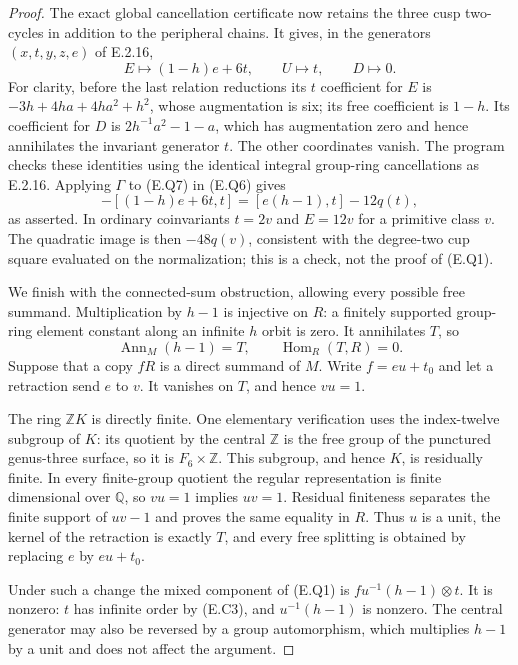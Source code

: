 \begin{proof}
The exact global cancellation certificate now retains
the three cusp two-cycles in addition to the peripheral
chains.  It gives, in the generators $(x,t,y,z,e)$ of
E.2.16,
\[
 E\longmapsto(1-h)e+6t,\qquad
 U\longmapsto t,\qquad D\longmapsto0.
 \tag{E.Q7}
\]
For clarity, before the last relation reductions its
$t$ coefficient for $E$ is
$-3h+4ha+4ha^2+h^2$, whose augmentation is six;
its free coefficient is $1-h$.  Its coefficient for $D$
is $2h^{-1}a^2-1-a$, which has augmentation zero and hence
annihilates the invariant generator $t$.  The other
coordinates vanish.  The program
 checks these identities
using the identical integral group-ring cancellations as
E.2.16.  Applying $\Gamma$ to (E.Q7) in (E.Q6) gives
\[
 -[(1-h)e+6t,t]
                =[e(h-1),t]-12q(t),
\]
as asserted.  In ordinary coinvariants $t=2v$ and
$E=12v$ for a primitive class $v$.  The quadratic image
is then $-48q(v)$, consistent with the degree-two cup
square evaluated on the normalization; this is a check,
not the proof of (E.Q1).

We finish with the connected-sum obstruction, allowing
every possible free summand.  Multiplication by $h-1$
is injective on $R$: a finitely supported group-ring
element constant along an infinite $h$ orbit is zero.
It annihilates $T$, so
\[
 \operatorname{Ann}_M(h-1)=T,
                       \qquad\operatorname{Hom}_R(T,R)=0.
 \tag{E.Q8}
\]
Suppose that a copy $fR$ is a direct summand of $M$.
Write $f=eu+t_0$ and let a retraction send $e$ to $v$.
It vanishes on $T$, and hence $vu=1$.

The ring $\mathbb ZK$ is directly finite.  One elementary
verification uses the index-twelve subgroup of $K$:
its quotient by the central $\mathbb Z$ is the free group
of the punctured genus-three surface, so it is
$F_6\times\mathbb Z$.  This subgroup, and hence $K$, is
residually finite.  In every finite-group quotient the
regular representation is finite dimensional over
$\mathbb Q$, so $vu=1$ implies $uv=1$.  Residual
finiteness separates the finite support of $uv-1$ and
proves the same equality in $R$.  Thus $u$ is a unit,
the kernel of the retraction is exactly $T$, and every
free splitting is obtained by replacing $e$ by
$eu+t_0$.

Under such a change the mixed component of (E.Q1) is
$f u^{-1}(h-1)\otimes t$.  It is nonzero: $t$ has
infinite order by (E.C3), and $u^{-1}(h-1)$ is nonzero.
The central generator may also be reversed by a group
automorphism, which multiplies $h-1$ by a unit and
does not affect the argument.


\end{proof}
